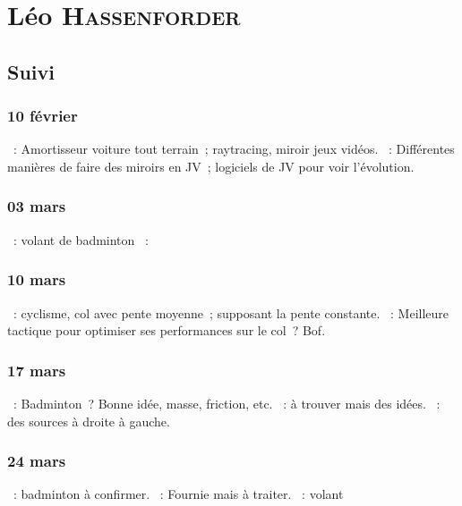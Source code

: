 \documentclass[a4paper, 11pt, final, garamond]{book}
\begin{document}
\chapter{Léo \textsc{Hassenforder}}
\label{ch:leo}
\section{Suivi}
\subsection{10 février}
\begin{itemize}
    ~: Amortisseur voiture tout terrain~; raytracing, miroir jeux
        vidéos.
    ~: Différentes manières de faire des miroirs en JV~;
        logiciels de JV pour voir l'évolution.
\end{itemize}
    
\subsection{03 mars}
\begin{itemize}
    ~: volant de badminton
    ~: \xmark
\end{itemize}

\subsection{10 mars}
\begin{itemize}
    ~: cyclisme, col avec pente moyenne~; supposant la pente
        constante.
    ~: Meilleure tactique pour optimiser ses performances sur le
        col~? Bof.
\end{itemize}

\subsection{17 mars}
\begin{itemize}
    ~: Badminton~? Bonne idée, masse, friction, etc.
    ~: à trouver mais des idées.
    ~: des sources à droite à gauche.
\end{itemize}

\subsection{24 mars}
\begin{itemize}
    ~: badminton à confirmer.
    ~: Fournie mais à traiter.
    ~: volant
\end{itemize}
\end{document}
